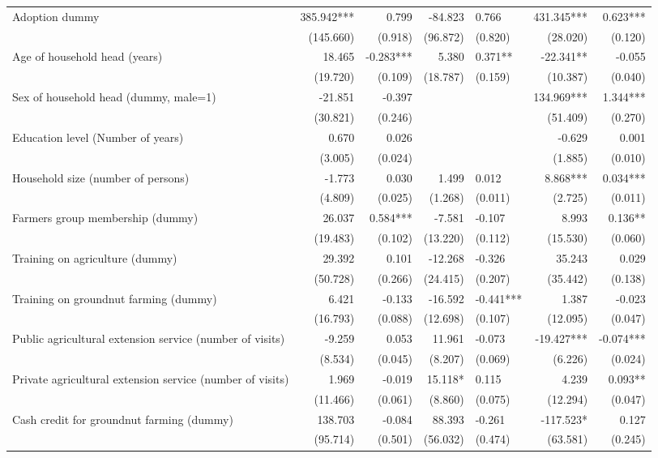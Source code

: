 \documentclass[
]{article}
\begin{document}
\begin{landscape}
\begin{longtable}[t]{lrrrlrr}
\endfoot
\bottomrule
\endlastfoot
Adoption dummy & 385.942*** & 0.799 & -84.823 & 0.766 & 431.345*** & 0.623***\\
 & (145.660) & (0.918) & (96.872) & (0.820) & (28.020) & (0.120)\\
Age of household head (years) & 18.465 & -0.283*** & 5.380 & 0.371** & -22.341** & -0.055\\
 & (19.720) & (0.109) & (18.787) & (0.159) & (10.387) & (0.040)\\
Sex of household head (dummy, male=1) & -21.851 & -0.397 &  &  & 134.969*** & 1.344***\\
 & (30.821) & (0.246) &  &  & (51.409) & (0.270)\\
Education level (Number of years) & 0.670 & 0.026 &  &  & -0.629 & 0.001\\
 & (3.005) & (0.024) &  &  & (1.885) & (0.010)\\
Household size (number of persons) & -1.773 & 0.030 & 1.499 & 0.012 & 8.868*** & 0.034***\\
 & (4.809) & (0.025) & (1.268) & (0.011) & (2.725) & (0.011)\\
Farmers group membership (dummy) & 26.037 & 0.584*** & -7.581 & -0.107 & 8.993 & 0.136**\\
 & (19.483) & (0.102) & (13.220) & (0.112) & (15.530) & (0.060)\\
Training on agriculture (dummy) & 29.392 & 0.101 & -12.268 & -0.326 & 35.243 & 0.029\\
 & (50.728) & (0.266) & (24.415) & (0.207) & (35.442) & (0.138)\\
Training on groundnut farming (dummy) & 6.421 & -0.133 & -16.592 & -0.441*** & 1.387 & -0.023\\
 & (16.793) & (0.088) & (12.698) & (0.107) & (12.095) & (0.047)\\
Public agricultural extension service (number of visits) & -9.259 & 0.053 & 11.961 & -0.073 & -19.427*** & -0.074***\\
 & (8.534) & (0.045) & (8.207) & (0.069) & (6.226) & (0.024)\\
Private agricultural extension service (number of visits) & 1.969 & -0.019 & 15.118* & 0.115 & 4.239 & 0.093**\\
 & (11.466) & (0.061) & (8.860) & (0.075) & (12.294) & (0.047)\\
Cash credit for groundnut farming (dummy) & 138.703 & -0.084 & 88.393 & -0.261 & -117.523* & 0.127\\
 & (95.714) & (0.501) & (56.032) & (0.474) & (63.581) & (0.245)\\

\end{longtable}
\end{landscape}
\end{document}
